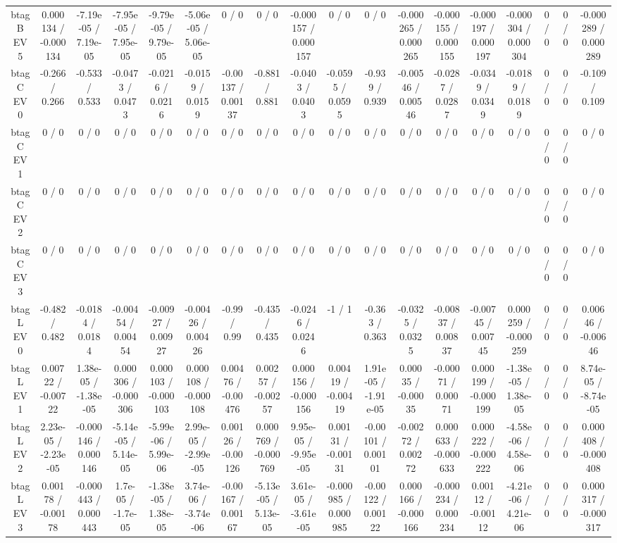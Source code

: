 \documentclass[10pt]{article}
\begin{document}
\begin{table}[htbp]
\begin{center}
\begin{tabular}{|c|c|c|c|c|c|c|c|c|c|c|c|c|c|c|c|c|c|}
  btag B EV 5 & 0.000134 / -0.000134 & -7.19e-05 / 7.19e-05 & -7.95e-05 / 7.95e-05 & -9.79e-05 / 9.79e-05 & -5.06e-05 / 5.06e-05 & 0 / 0 & 0 / 0 & -0.000157 / 0.000157 & 0 / 0 & 0 / 0 & -0.000265 / 0.000265 & -0.000155 / 0.000155 & -0.000197 / 0.000197 & -0.000304 / 0.000304 & 0 / 0 & 0 / 0 & -0.000289 / 0.000289 \\ 
  btag C EV 0 & -0.266 / 0.266 & -0.533 / 0.533 & -0.0473 / 0.0473 & -0.0216 / 0.0216 & -0.0159 / 0.0159 & -0.00137 / 0.00137 & -0.881 / 0.881 & -0.0403 / 0.0403 & -0.0595 / 0.0595 & -0.939 / 0.939 & -0.00546 / 0.00546 & -0.0287 / 0.0287 & -0.0349 / 0.0349 & -0.0189 / 0.0189 & 0 / 0 & 0 / 0 & -0.109 / 0.109 \\ 
  btag C EV 1 & 0 / 0 & 0 / 0 & 0 / 0 & 0 / 0 & 0 / 0 & 0 / 0 & 0 / 0 & 0 / 0 & 0 / 0 & 0 / 0 & 0 / 0 & 0 / 0 & 0 / 0 & 0 / 0 & 0 / 0 & 0 / 0 & 0 / 0 \\ 
  btag C EV 2 & 0 / 0 & 0 / 0 & 0 / 0 & 0 / 0 & 0 / 0 & 0 / 0 & 0 / 0 & 0 / 0 & 0 / 0 & 0 / 0 & 0 / 0 & 0 / 0 & 0 / 0 & 0 / 0 & 0 / 0 & 0 / 0 & 0 / 0 \\ 
  btag C EV 3 & 0 / 0 & 0 / 0 & 0 / 0 & 0 / 0 & 0 / 0 & 0 / 0 & 0 / 0 & 0 / 0 & 0 / 0 & 0 / 0 & 0 / 0 & 0 / 0 & 0 / 0 & 0 / 0 & 0 / 0 & 0 / 0 & 0 / 0 \\ 
  btag L EV 0 & -0.482 / 0.482 & -0.0184 / 0.0184 & -0.00454 / 0.00454 & -0.00927 / 0.00927 & -0.00426 / 0.00426 & -0.99 / 0.99 & -0.435 / 0.435 & -0.0246 / 0.0246 & -1 / 1 & -0.363 / 0.363 & -0.0325 / 0.0325 & -0.00837 / 0.00837 & -0.00745 / 0.00745 & 0.000259 / -0.000259 & 0 / 0 & 0 / 0 & 0.00646 / -0.00646 \\ 
  btag L EV 1 & 0.00722 / -0.00722 & 1.38e-05 / -1.38e-05 & 0.000306 / -0.000306 & 0.000103 / -0.000103 & 0.000108 / -0.000108 & 0.00476 / -0.00476 & 0.00257 / -0.00257 & 0.000156 / -0.000156 & 0.00419 / -0.00419 & 1.91e-05 / -1.91e-05 & 0.00035 / -0.00035 & -0.00071 / 0.00071 & 0.000199 / -0.000199 & -1.38e-05 / 1.38e-05 & 0 / 0 & 0 / 0 & 8.74e-05 / -8.74e-05 \\ 
  btag L EV 2 & 2.23e-05 / -2.23e-05 & -0.000146 / 0.000146 & -5.14e-05 / 5.14e-05 & -5.99e-06 / 5.99e-06 & 2.99e-05 / -2.99e-05 & 0.00126 / -0.00126 & 0.000769 / -0.000769 & 9.95e-05 / -9.95e-05 & 0.00131 / -0.00131 & -0.00101 / 0.00101 & -0.00272 / 0.00272 & 0.000633 / -0.000633 & 0.000222 / -0.000222 & -4.58e-06 / 4.58e-06 & 0 / 0 & 0 / 0 & 0.000408 / -0.000408 \\ 
  btag L EV 3 & 0.00178 / -0.00178 & -0.000443 / 0.000443 & 1.7e-05 / -1.7e-05 & -1.38e-05 / 1.38e-05 & 3.74e-06 / -3.74e-06 & -0.00167 / 0.00167 & -5.13e-05 / 5.13e-05 & 3.61e-05 / -3.61e-05 & -0.000985 / 0.000985 & -0.00122 / 0.00122 & 0.000166 / -0.000166 & -0.000234 / 0.000234 & 0.00112 / -0.00112 & -4.21e-06 / 4.21e-06 & 0 / 0 & 0 / 0 & 0.000317 / -0.000317 \\ 

\end{tabular}
\end{center}
\end{table}
\end{document}
